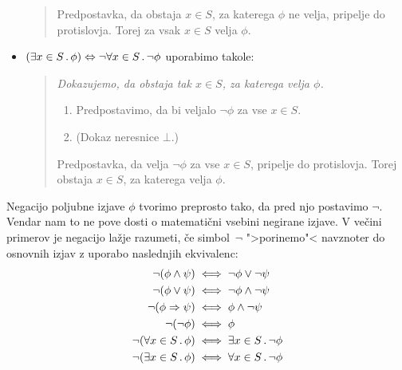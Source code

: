 \begin{itemize}
\begin{quote}
\begin{enumerate}
    \end{enumerate}
    Predpostavka, da obstaja $x \in S$, za katerega $\phi$ ne velja,
    pripelje do protislovja. Torej za vsak $x \in S$ velja $\phi$.
  \end{quote}
\item $(\exists x \in S \,.\, \phi) \Leftrightarrow \lnot \forall x \in S \,.\, \lnot \phi$
  uporabimo takole:
  \begin{quote}
    \it
    Dokazujemo, da obstaja tak $x \in S$, za katerega velja $\phi$.
    \begin{enumerate}
    \item Predpostavimo, da bi veljalo $\lnot\phi$ za vse $x \in S$.
    \item (Dokaz neresnice $\bot$.)
    \end{enumerate}
    Predpostavka, da velja $\lnot\phi$ za vse $x \in S$, pripelje do
    protislovja. Torej obstaja $x \in S$, za katerega velja $\phi$.
  \end{quote}
\end{itemize}

Negacijo poljubne izjave $\phi$ tvorimo preprosto tako, da pred njo
postavimo $\lnot$. Vendar nam to ne pove dosti o matematični vsebini
negirane izjave. V večini primerov je negacijo lažje razumeti, če
simbol~$\lnot$ ">porinemo"< navznoter do osnovnih izjav z uporabo
naslednjih ekvivalenc:
%
\begin{align*}
  \lnot (\phi \land \psi) &\iff \lnot\phi \lor \lnot\psi \\
  \lnot (\phi \lor \psi) &\iff \lnot\phi \land \lnot\psi \\
  \lnot (\phi \Rightarrow \psi) &\iff \phi \land \lnot\psi \\
  \lnot (\lnot \phi) &\iff \phi \\
  \lnot (\forall x \in S \,.\, \phi) &\iff \exists x \in S \,.\, \lnot\phi \\
  \lnot (\exists x \in S \,.\, \phi) &\iff \forall x \in S \,.\, \lnot\phi
\end{align*}

